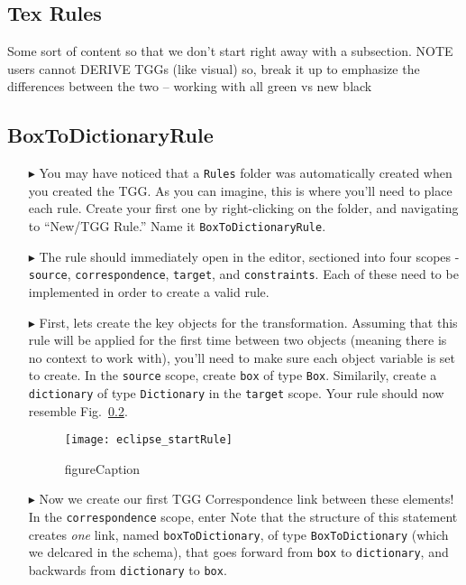 \newpage
\hypertarget{rules tex}{}
\subsection{Tex Rules}
\texHeader

Some sort of content so that we don't start right away with a subsection. NOTE users cannot DERIVE TGGs (like visual) so, break it up to emphasize the
differences between the two -- working with all green vs new black

\subsection{BoxToDictionaryRule}

\begin{itemize}

\item[$\blacktriangleright$] You may have noticed that a \texttt{Rules} folder was automatically created when you created the TGG. As you can imagine, this is
where you'll need to place each rule. Create your first one by right-clicking on the folder, and navigating to ``New/TGG Rule.'' Name it
\texttt{BoxToDictionaryRule}.

\item[$\blacktriangleright$] The rule should immediately open in the editor, sectioned into four scopes - \texttt{source}, \texttt{correspondence},
\texttt{target}, and \texttt{constraints}. Each of these need to be implemented in order to create a valid rule.

\item[$\blacktriangleright$] First, lets create the key objects for the transformation. Assuming that this rule will be applied for the first time between two
objects (meaning there is no context to work with), you'll need to make sure each object variable is set to create. In the \texttt{source} scope, create
\texttt{box} of type \texttt{Box}. Similarily, create a \texttt{dictionary} of type \texttt{Dictionary} in the \texttt{target} scope. Your rule should now
resemble Fig.~\ref{}.

\begin{figure}[htbp]
\begin{center}
  \texttt{[image: eclipse\_startRule]}
  \caption{figureCaption}
  \label{fig:textSourceRule}
\end{center}
\end{figure}

\item[$\blacktriangleright$] Now we create our first TGG Correspondence link between these elements! In the \texttt{correspondence} scope, enter 
Note that the structure of this statement creates \emph{one} link, named \texttt{boxToDictionary}, of type \texttt{BoxToDictionary} (which we delcared in the
schema), that goes forward from \texttt{box} to \texttt{dictionary}, and backwards from \texttt{dictionary} to \texttt{box}.


\end{itemize}
